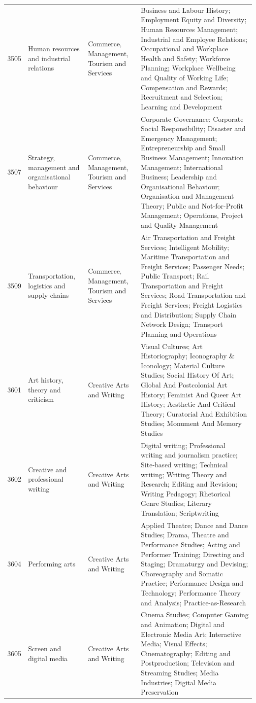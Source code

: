 \begin{longtable}{r p{2.45cm} p{2.55cm} p{6.15cm}}
3505 & Human resources and industrial relations & Commerce, Management, Tourism and Services & Business and Labour History; Employment Equity and Diversity; Human Resources Management; Industrial and Employee Relations; Occupational and Workplace Health and Safety; Workforce Planning; Workplace Wellbeing and Quality of Working Life; Compensation and Rewards; Recruitment and Selection; Learning and Development \\
3507 & Strategy, management and organisational behaviour & Commerce, Management, Tourism and Services & Corporate Governance; Corporate Social Responsibility; Disaster and Emergency Management; Entrepreneurship and Small Business Management; Innovation Management; International Business; Leadership and Organisational Behaviour; Organisation and Management Theory; Public and Not-for-Profit Management; Operations, Project and Quality Management \\
3509 & Transportation, logistics and supply chains & Commerce, Management, Tourism and Services & Air Transportation and Freight Services; Intelligent Mobility; Maritime Transportation and Freight Services; Passenger Needs; Public Transport; Rail Transportation and Freight Services; Road Transportation and Freight Services; Freight Logistics and Distribution; Supply Chain Network Design; Transport Planning and Operations \\
3601 & Art history, theory and criticism & Creative Arts and Writing & Visual Cultures; Art Historiography; Iconography \& Iconology; Material Culture Studies; Social History Of Art; Global And Postcolonial Art History; Feminist And Queer Art History; Aesthetic And Critical Theory; Curatorial And Exhibition Studies; Monument And Memory Studies \\
3602 & Creative and professional writing & Creative Arts and Writing & Digital writing; Professional writing and journalism practice; Site-based writing; Technical writing; Writing Theory and Research; Editing and Revision; Writing Pedagogy; Rhetorical Genre Studies; Literary Translation; Scriptwriting \\
3604 & Performing arts & Creative Arts and Writing & Applied Theatre; Dance and Dance Studies; Drama, Theatre and Performance Studies; Acting and Performer Training; Directing and Staging; Dramaturgy and Devising; Choreography and Somatic Practice; Performance Design and Technology; Performance Theory and Analysis; Practice-as-Research \\
3605 & Screen and digital media & Creative Arts and Writing & Cinema Studies; Computer Gaming and Animation; Digital and Electronic Media Art; Interactive Media; Visual Effects; Cinematography; Editing and Postproduction; Television and Streaming Studies; Media Industries; Digital Media Preservation \\

\end{longtable}
